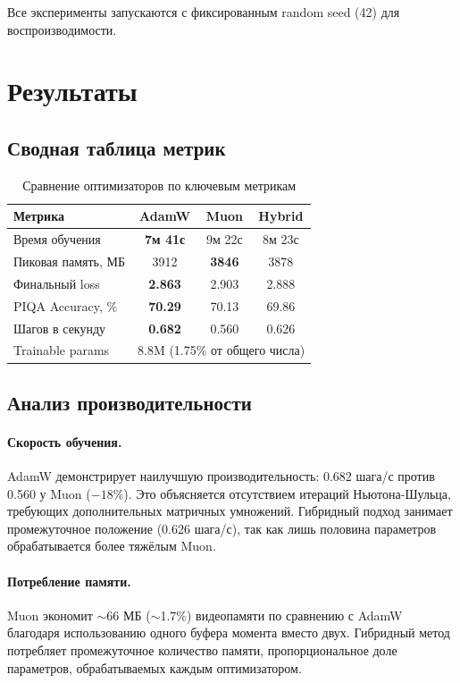 \documentclass[a4paper,12pt]{article}
\begin{document}
Все эксперименты запускаются с фиксированным random seed (42) для воспроизводимости.
\newpage

\section{Результаты}
\label{sec:results}

\subsection{Сводная таблица метрик}

\begin{table}[H]
\centering
\caption{Сравнение оптимизаторов по ключевым метрикам}
\label{tab:results}
\begin{tabular}{lccc}
\toprule
\textbf{Метрика} & \textbf{AdamW} & \textbf{Muon} & \textbf{Hybrid} \\
\midrule
Время обучения & \textbf{7м 41с} & 9м 22с & 8м 23с \\
Пиковая память, МБ & 3912 & \textbf{3846} & 3878 \\
Финальный loss & \textbf{2.863} & 2.903 & 2.888 \\
PIQA Accuracy, \% & \textbf{70.29} & 70.13 & 69.86 \\
Шагов в секунду & \textbf{0.682} & 0.560 & 0.626 \\
Trainable params & \multicolumn{3}{c}{8.8M (1.75\% от общего числа)} \\
\bottomrule
\end{tabular}
\end{table}

\subsection{Анализ производительности}

\paragraph{Скорость обучения.}
AdamW демонстрирует наилучшую производительность: 0.682 шага/с против 0.560 у Muon ($-18\%$). Это объясняется отсутствием итераций Ньютона-Шульца, требующих дополнительных матричных умножений. Гибридный подход занимает промежуточное положение (0.626 шага/с), так как лишь половина параметров обрабатывается более тяжёлым Muon.

\paragraph{Потребление памяти.}
Muon экономит $\sim$66 МБ ($\sim$1.7\%) видеопамяти по сравнению с AdamW благодаря использованию одного буфера момента вместо двух. Гибридный метод потребляет промежуточное количество памяти, пропорциональное доле параметров, обрабатываемых каждым оптимизатором.
\end{document}
